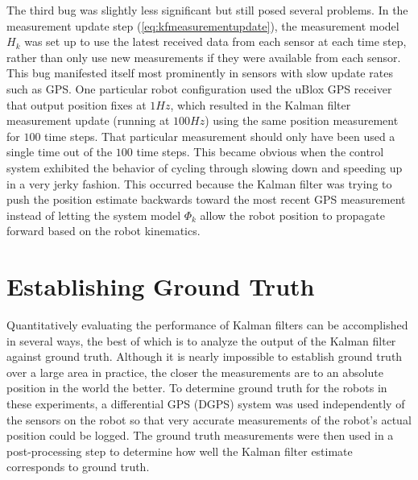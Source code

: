 The third bug was slightly less significant but still posed several problems.
In the measurement update step (\ref{eq:kfmeasurementupdate}), the measurement model $H_k$ was set up to use the latest received data from each sensor at each time step, rather than only use new measurements if they were available from each sensor.
This bug manifested itself most prominently in sensors with slow update rates such as GPS\@.
One particular robot configuration used the uBlox GPS receiver that output position fixes at $1 Hz$, which resulted in the Kalman filter measurement update (running at $100 Hz$) using the same position measurement for $100$ time steps.
That particular measurement should only have been used a single time out of the $100$ time steps.
This became obvious when the control system exhibited the behavior of cycling through slowing down and speeding up in a very jerky fashion.
This occurred because the Kalman filter was trying to push the position estimate backwards toward the most recent GPS measurement instead of letting the system model $\Phi_k$ allow the robot position to propagate forward based on the robot kinematics.

\section{Establishing Ground Truth}%
\label{sec:groundtruth}
Quantitatively evaluating the performance of Kalman filters can be accomplished in several ways, the best of which is to analyze the output of the Kalman filter against ground truth.
Although it is nearly impossible to establish ground truth over a large area in practice, the closer the measurements are to an absolute position in the world the better.
To determine ground truth for the robots in these experiments, a differential GPS (DGPS) system was used independently of the sensors on the robot so that very accurate measurements of the robot's actual position could be logged.
The ground truth measurements were then used in a post-processing step to determine how well the Kalman filter estimate corresponds to ground truth.

